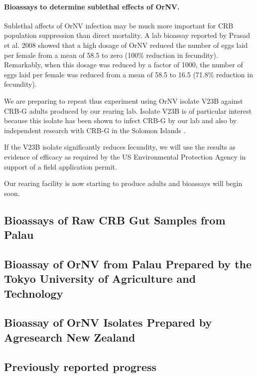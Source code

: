 \documentclass[12pt,letterpaper,english,bibliography=totocnumbered, abstract=on]{scrartcl}
\begin{document}
\paragraph{Bioassays to determine sublethal effects of OrNV.}

Sublethal affects of OrNV infection may be much more important for CRB population suppression than direct mortality. A lab bioassay reported by Prasad et al. 2008 \cite{prasadManagementCoconutRhinoceros2008} showed that a high dosage of OrNV reduced the number of eggs laid per female from a mean of 58.5 to zero (100\% reduction in fecundity). Remarkably, when this dosage was reduced by a factor of 1000, the number of eggs laid per female was reduced from a mean of 58.5 to 16.5 (71.8\% reduction in fecundity).

We are preparing to repeat thus experiment using OrNV isolate V23B against CRB-G adults produced by our rearing lab. Isolate V23B is of particular interest because this isolate has been shown to infect CRB-G by our lab and also by independent research with CRB-G in the Solomon Islands \cite{barreraElectronMicroscopyStudy2021}. 

If the V23B isolate significantly reduces fecundity, we will use the results as evidence of efficacy as required by the US Environmental Protection Agency in support of a field application permit.

Our rearing facility is now starting to produce adults and bioassays will begin soon.

\clearpage

\subsection{Bioassays of Raw CRB Gut Samples from Palau}

\subsection{Bioassay of OrNV from Palau Prepared by the Tokyo University of Agriculture and Technology}

\subsection{Bioassay of OrNV Isolates Prepared by Agresearch New Zealand}

\subsection{Previously reported progress}
\end{document}
